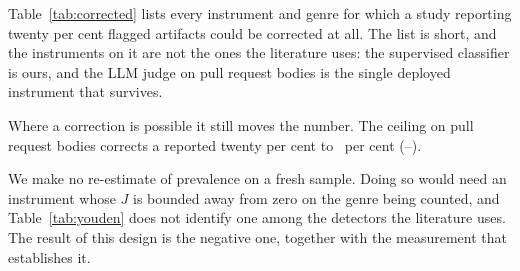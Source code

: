 

Table~\ref{tab:corrected} lists every instrument and genre for which a study reporting
twenty per cent flagged artifacts could be corrected at all. The list is short, and the
instruments on it are not the ones the literature uses: the supervised classifier is
ours, and the LLM judge on pull request bodies is the single deployed instrument that
survives.

Where a correction is possible it still moves the number. The ceiling on pull request
bodies corrects a reported twenty per cent to \CeilingCorrectedTwenty{}~per cent
(\CeilingCorrectedTwentyLo{}--\CeilingCorrectedTwentyHi{}).

We make no re-estimate of prevalence on a fresh sample. Doing so would need an
instrument whose $J$ is bounded away from zero on the genre being counted, and
Table~\ref{tab:youden} does not identify one among the detectors the literature uses.
The result of this design is the negative one, together with the measurement that
establishes it.
